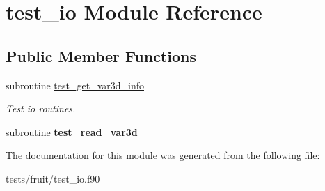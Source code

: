 \hypertarget{classtest__io}{\section{test\-\_\-io Module Reference}
\label{classtest__io}
}
\subsection*{Public Member Functions}
\begin{DoxyCompactItemize}
\item 
\hypertarget{classtest__io_a03d566a9d7b3b94f879d12d20cd7041a}{subroutine \hyperlink{classtest__io_a03d566a9d7b3b94f879d12d20cd7041a}{test\-\_\-get\-\_\-var3d\-\_\-info}}\label{classtest__io_a03d566a9d7b3b94f879d12d20cd7041a}

\begin{DoxyCompactList}\small\item\em Test io routines. \end{DoxyCompactList}\item 
\hypertarget{classtest__io_a8200c04cb629aac65720e780a1b20eac}{subroutine {\bfseries test\-\_\-read\-\_\-var3d}}\label{classtest__io_a8200c04cb629aac65720e780a1b20eac}

\end{DoxyCompactItemize}


The documentation for this module was generated from the following file\-:\begin{DoxyCompactItemize}
\item 
tests/fruit/test\-\_\-io.\-f90\end{DoxyCompactItemize}
